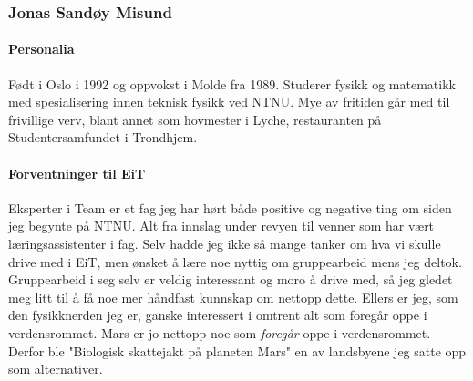 \subsubsection{Jonas Sandøy Misund}

\paragraph{Personalia}
Født i Oslo i 1992 og oppvokst i Molde fra 1989.
Studerer fysikk og matematikk med spesialisering innen teknisk fysikk ved NTNU.
Mye av fritiden går med til frivillige verv, blant annet som hovmester i Lyche, restauranten på Studentersamfundet i Trondhjem.

\paragraph{Forventninger til EiT}
Eksperter i Team er et fag jeg har hørt både positive og negative ting om siden jeg begynte på NTNU.
Alt fra innslag under revyen til venner som har vært læringsassistenter i fag.
Selv hadde jeg ikke så mange tanker om hva vi skulle drive med i EiT, men ønsket å lære noe nyttig om gruppearbeid mens jeg deltok.
Gruppearbeid i seg selv er veldig interessant og moro å drive med, så jeg gledet meg litt til å få noe mer håndfast kunnskap om nettopp dette.
Ellers er jeg, som den fysikknerden jeg er, ganske interessert i omtrent alt som foregår oppe i verdensrommet.
Mars er jo nettopp noe som \textit{foregår} oppe i verdensrommet.
Derfor ble "Biologisk skattejakt på planeten Mars" en av landsbyene jeg satte opp som alternativer.